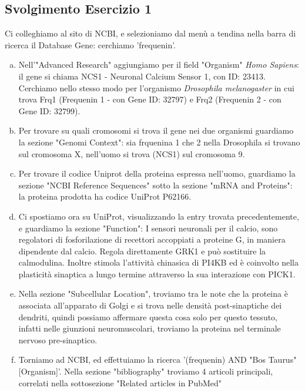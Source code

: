 \documentclass{article}
\begin{document}
\subsection*{Svolgimento Esercizio 1}
Ci colleghiamo al sito di NCBI, e selezioniamo dal menù a tendina nella barra di ricerca il Database Gene: cerchiamo 'frequenin'.
\begin{enumerate}[a)]
   \item Nell'"Advanced Research" aggiungiamo per il field "Organism" \textit{Homo Sapiens}: il gene si chiama NCS1 - Neuronal Calcium Sensor 1, con ID: 23413.\\Cerchiamo nello stesso modo per l'organismo \textit{Drosophila melanogaster} in cui trova Frq1 (Frequenin 1 - con Gene ID: 32797) e Frq2 (Frequenin 2 - con Gene ID: 32799).
   \item Per trovare su quali cromosomi si trova il gene nei due organismi guardiamo la sezione "Genomi Context": sia frquenina 1 che 2 nella Drosophila si trovano sul cromosoma X, nell'uomo si trova (NCS1) sul cromosoma 9.
   \item Per trovare il codice Uniprot della proteina espressa nell'uomo, guardiamo la sezione "NCBI Reference Sequences" sotto la sezione "mRNA and Proteins": la proteina prodotta ha codice UniProt P62166.
   \item Ci spostiamo ora su UniProt, visualizzando la entry trovata precedentemente, e guardiamo la sezione "Function": I sensori neuronali per il calcio, sono regolatori di fosforilazione di recettori accoppiati a proteine G, in maniera dipendente dal calcio. Regola direttamente GRK1 e può sostituire la calmodulina. Inoltre stimola l'attività chinasica di PI4KB ed è coinvolto nella plasticità sinaptica a lungo termine attraverso la sua interazione con PICK1.
   \item Nella sezione "Subcellular Location", troviamo tra le note che la proteina è associata all'apparato di Golgi e si trova nelle densità post-sinaptiche dei dendriti, quindi possiamo affermare questa cosa solo per questo tessuto, infatti nelle giunzioni neuromuscolari, troviamo la proteina nel terminale nervoso pre-sinaptico.
   \item Torniamo ad NCBI, ed effettuiamo la ricerca '(frequenin) AND "Bos Taurus"[Organism]'. Nella sezione "bibliography" troviamo 4 articoli principali, correlati nella sottosezione "Related articles in PubMed"
\end{enumerate}
\end{document}
